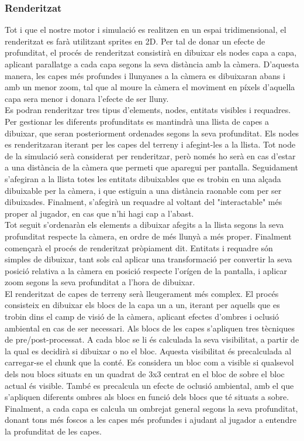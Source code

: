 \subsubsection{Renderitzat}
Tot i que el nostre motor i simulació es realitzen en un espai tridimensional, el renderitzat es farà utilitzant sprites en 2D. 
Per tal de donar un efecte de profunditat, el procés de renderitzat consistirà en dibuixar els nodes capa a capa, aplicant parallatge a cada capa segons la seva distància amb la càmera. 
D'aquesta manera, les capes més profundes i llunyanes a la càmera es dibuixaran abans i amb un menor zoom, tal que al moure la càmera el moviment en píxels d'aquella capa sera menor i donara l'efecte de ser lluny.
\\
Es podran renderitzar tres tipus d'elements, nodes, entitats visibles i requadres. Per gestionar les diferents profunditats es mantindrà una llista de capes a dibuixar, que seran posteriorment ordenades segons la seva profunditat. 
Els nodes es renderitzaran iterant per les capes del terreny i afegint-les a la llista. Tot node de la simulació serà considerat per renderitzar, però només ho serà en cas d'estar a una distància de la càmera que permeti que aparegui per pantalla. 
Seguidament s'afegiran a la llista totes les entitats dibuixables que es trobin en una alçada dibuixable per la càmera, i que estiguin a una distància raonable com per ser dibuixades.
Finalment, s'afegirà un requadre al voltant del "interactable" més proper al jugador, en cas que n'hi hagi cap a l'abast.
\\
Tot seguit s'ordenaràn els elements a dibuixar afegits a la llista segons la seva profunditat respecte la càmera, en ordre de més llunyà a més proper.
Finalment començarà el procés de renderitzat pròpiament dit. Entitats i requadre són simples de dibuixar, tant sols cal aplicar una transformació per convertir la seva posició relativa a la càmera en posició respecte l'orígen de la pantalla, i aplicar zoom segons la seva profunditat a l'hora de dibuixar.
\\
El renderitzat de capes de terreny serà lleugerament més complex. El procés consisteix en dibuixar els blocs de la capa un a un, iterant per aquells que es trobin dins el camp de visió de la càmera, aplicant efectes d'ombres i oclusió ambiental en cas de ser necessari.
Als blocs de les capes s'apliquen tres tècniques de pre/post-processat.
A cada bloc se li és calculada la seva visibilitat, a partir de la qual es decidirà si dibuixar o no el bloc. Aquesta visibilitat és precalculada al carregar-se el chunk que la conté. Es considera un bloc com a visible si qualsevol dels nou blocs situats en un quadrat de 3x3 centrat en el bloc de sobre el bloc actual és visible.
També es precalcula un efecte de oclusió ambiental, amb el que s'apliquen diferents ombres als blocs en funció dels blocs que té situats a sobre.
Finalment, a cada capa es calcula un ombrejat general segons la seva profunditat, donant tons més foscos a les capes més profundes i ajudant al jugador a entendre la profunditat de les capes.


